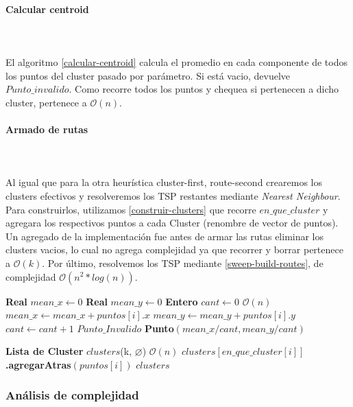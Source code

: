 \paragraph{Calcular centroid} \hspace{0pt} \\
\\
El algoritmo \ref{calcular-centroid} calcula el promedio en cada componente de todos los puntos del cluster pasado por parámetro. Si está vacio, devuelve $Punto\_invalido$. Como recorre todos los puntos y chequea si pertenecen a dicho cluster, pertenece a $\mathcal{O}(n)$.
\paragraph{Armado de rutas}\hspace{0pt} \\
\\
Al igual que para la otra heurística cluster-first, route-second crearemos los clusters efectivos y resolveremos los TSP restantes mediante \textit{Nearest Neighbour}.  Para construirlos, utilizamos \ref{construir-clusters} que recorre $en\_que\_cluster$ y agregara los respectivos puntos a cada Cluster (renombre de vector de puntos). Un agregado de la implementación fue antes de armar las rutas eliminar los clusters vacios, lo cual no agrega complejidad ya que recorrer y borrar pertenece a $\mathcal{O}(k)$. Por último, resolvemos los TSP mediante \ref{sweep-build-routes}, de complejidad $\mathcal{O}(n^2*log(n))$.
\begin{algorithm}[H]
	\caption{\Comment $\mathcal{O}(n)$}
	\label{calcular-centroid}
	\begin{algorithmic}[1]
		\State \textbf{Real } $mean\_x \gets 0$
		\State \textbf{Real } $mean\_y \gets 0$
		\State \textbf{Entero } $cant \gets 0$
		 \Comment $\mathcal{O}(n)$
		\State $mean\_x \gets mean\_x + puntos[i].x$
		\State $mean\_y \gets mean\_y + puntos[i].y$
		\State $cant \gets cant+1$
		\EndIf
		\EndFor
		\State \Return $Punto\_Invalido$
		\EndIf
		\State \Return \textbf{Punto}$(mean\_x/cant, mean\_y/cant)$
		\EndFunction
	\end{algorithmic}
\end{algorithm}

\begin{algorithm}[H]
	\caption{\Comment $\mathcal{O}(n)$}
	\label{construir-clusters}
	\begin{algorithmic}[1]
		\State \textbf{Lista de Cluster} $clusters$(k, $\varnothing$)
		\Statex
		\Comment $\mathcal{O}(n)$
		\State $clusters[en\_que\_cluster[i]]$\textbf{.agregarAtras}$(puntos[i])$
		\EndFor
		\Statex
		\State \Return $clusters$
		\EndFunction
	\end{algorithmic}
\end{algorithm}

\subsubsection{Análisis de complejidad}
